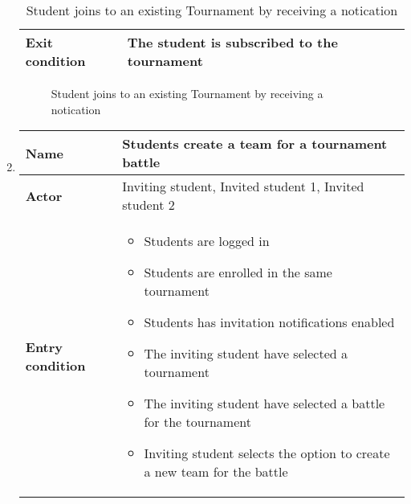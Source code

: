\begin{enumerate}[label=\textbf{UC\arabic*}:,leftmargin=1.3cm]
\begin{table}[H]
\begin{tabular}{|l|p{11.9cm}|}
                        \textbf{Exit condition}  & The student is subscribed to the tournament                                                \\\hline
                  \end{tabular}
                  \caption{Student joins to an existing Tournament by receiving a notication}
                  \label{table:Student joins to an existing Tournament by receiving a notication}
            \end{table}

            \begin{figure}[H]
                  \centering
                  \caption{Student joins to an existing Tournament by receiving a notication}
                  \label{fig:Student joins to an existing Tournament by receiving a notication}
            \end{figure}
            \pagebreak
      \item \textbf{}
            \begin{table}[H]
                  \centering
                  \begin{tabular}{|l|p{11.9cm}|}
                        \hline
                        \textbf{Name}            & Students create a team for a tournament battle                              \\\hline
                        \textbf{Actor}           & Inviting student, Invited student 1, Invited student 2                      \\\hline
                        \textbf{Entry condition} &
                        \begin{itemize}
                              \item Students are logged in
                              \item Students are enrolled in the same tournament
                              \item Students has invitation notifications enabled
                              \item The inviting student have selected a tournament
                              \item The inviting student have selected a battle for the tournament
                              \item Inviting student selects the option to create a new team for the battle

\end{itemize}
\end{tabular}
\end{table}
\end{enumerate}
